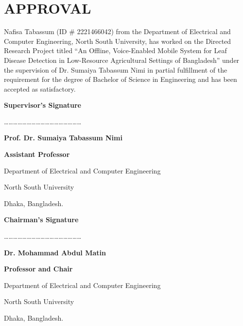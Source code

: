 \documentclass[12pt,letterpaper]{report}
\begin{document}
\chapter*{APPROVAL}

\setlength{\parskip}{0pt}

Nafisa Tabassum (ID \# 2221466042) from the Department of Electrical and Computer Engineering, North South University, has worked on the Directed Research Project titled ``An Offline, Voice-Enabled Mobile System for Leaf Disease Detection in Low-Resource Agricultural Settings of Bangladesh'' under the supervision of Dr. Sumaiya Tabassum Nimi in partial fulfillment of the requirement for the degree of Bachelor of Science in Engineering and has been accepted as satisfactory.

\vspace{12pt}

\begin{center}
{\fontsize{14}{17}\selectfont\bfseries Supervisor's Signature}

\vspace{24pt}

\vspace{12pt}

{\fontsize{14}{17}\selectfont ……………………………………………}

{\fontsize{14}{17}\selectfont\bfseries Prof. Dr. Sumaiya Tabassum Nimi}

{\fontsize{14}{17}\selectfont\bfseries Assistant Professor}

{\fontsize{14}{17}\selectfont Department of Electrical and Computer Engineering}

{\fontsize{14}{17}\selectfont North South University}

{\fontsize{14}{17}\selectfont Dhaka, Bangladesh.}

\vspace{12pt}

{\fontsize{14}{17}\selectfont\bfseries Chairman's Signature}

\vspace{24pt}

\vspace{12pt}

{\fontsize{14}{17}\selectfont ……………………………………………}

{\fontsize{14}{17}\selectfont\bfseries Dr. Mohammad Abdul Matin}

{\fontsize{14}{17}\selectfont\bfseries Professor and Chair}

{\fontsize{14}{17}\selectfont Department of Electrical and Computer Engineering}

{\fontsize{14}{17}\selectfont North South University}

{\fontsize{14}{17}\selectfont Dhaka, Bangladesh.}
\end{center}
\end{document}
